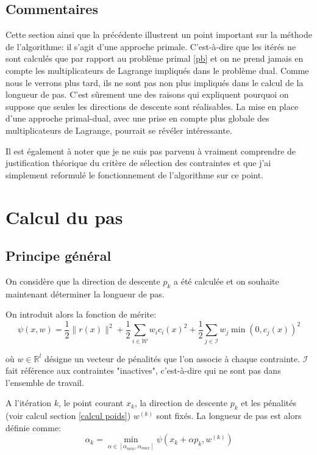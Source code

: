 \documentclass[a4paper,11pt]{article}
\newcommand{\real}{\mathbb{R}}
\numberwithin{equation}{section}
\begin{document}
\subsection{Commentaires}

Cette section ainsi que la précédente illustrent un point important sur la méthode de l'algorithme: il s'agit d'une approche primale. C'est-à-dire que les itérés ne sont calculés que par rapport au problème primal \ref{pb} et on ne prend jamais en compte les multiplicateurs de Lagrange impliqués dans le problème dual. Comme nous le verrons plus tard, ils ne sont pas non plus impliqués dans le calcul de la longueur de pas. C'est sûrement une des raisons qui expliquent pourquoi on suppose que seules les directions de descente sont réalisables. La mise en place d'une approche primal-dual, avec une prise en compte plus globale des multiplicateurs de Lagrange, pourrait se révéler intéressante.

Il est également à noter que je ne suis pas parvenu à vraiment comprendre de justification théorique du critère de sélection des contraintes et que j'ai simplement reformulé le fonctionnement de l'algorithme sur ce point.

\section{Calcul du pas}

\subsection{Principe général}

On considère que la direction de descente $p_{k}$ a été calculée et on souhaite maintenant déterminer la longueur de pas. 

On introduit alors la fonction de mérite: 
\begin{equation} \label{meritfunction}
\psi(x,w) = \dfrac{1}{2}\|r(x)\|^2 +  \dfrac{1}{2}\sum_{i \in \mathcal{W}} w_ic_i(x)^2 + \dfrac{1}{2} \sum_{j \in \mathcal{I}} w_j\min(0,c_j(x))^2
\end{equation}

où $w \in \real^{l}$ désigne un vecteur de pénalités que l'on associe à chaque contrainte. $\mathcal{I}$ fait référence aux contraintes "inactives", c'est-à-dire qui ne sont pas dans l'ensemble de travail.

A l'itération $k$, le point courant $x_{k}$, la direction de descente $p_{k}$ et les pénalités (voir calcul section \ref{calcul poids}) $w^{(k)}$ sont fixés. La longueur de pas est alors définie comme:
\begin{equation}
\alpha_{k} = \underset{\alpha \in [\alpha_{min},\alpha_{max}]}{\min} \psi(x_{k}+\alpha p_{k},w^{(k)})
\end{equation}
\end{document}
